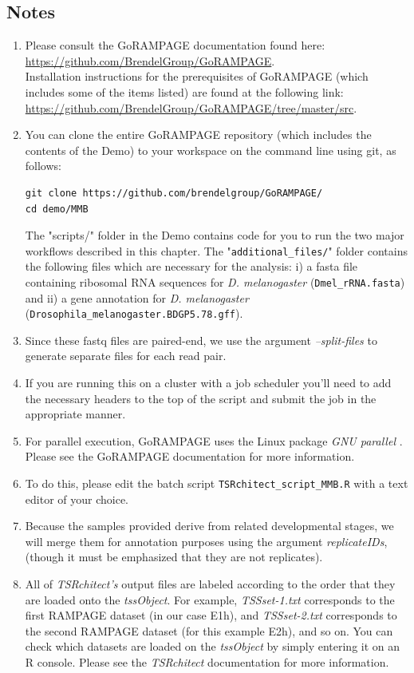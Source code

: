 \documentclass[runningheads,a4paper]{llncs}
\begin{document}
\begin{linenumbers}
\section{Notes}
\begin{enumerate}
\item Please consult the GoRAMPAGE documentation found here:\\
 \url{https://github.com/BrendelGroup/GoRAMPAGE}.\\
Installation instructions for the prerequisites of GoRAMPAGE (which includes some of the items listed) are found at the following link:\\
 \url{https://github.com/BrendelGroup/GoRAMPAGE/tree/master/src}.
\item You can clone the entire GoRAMPAGE repository (which includes the contents of the Demo) to your workspace on the command line using git, as follows:
\begin{verbatim}
git clone https://github.com/brendelgroup/GoRAMPAGE/
cd demo/MMB
\end{verbatim}
The "scripts/" folder in the Demo contains code for you to run the two major workflows described in this chapter.
The "\texttt{additional\_files/}" folder contains the following files which are necessary for the analysis: i) a fasta file containing ribosomal RNA sequences for \textit{D. melanogaster} (\texttt{Dmel\_rRNA.fasta}) and ii) a gene annotation for \textit{D. melanogaster} (\texttt{Drosophila\_melanogaster.BDGP5.78.gff}).
\item Since these fastq files are paired-end, we use the argument \textit{--split-files} to generate separate files for each read pair.
\item If you are running this on a cluster with a job scheduler you'll need to add the necessary headers to the top of the script and submit the job in the appropriate manner.
\item For parallel execution, GoRAMPAGE uses the Linux package \textit{GNU parallel} \cite{Tange2011a}. 
Please see the GoRAMPAGE documentation for more information.
\item To do this, please edit the batch script \texttt{TSRchitect\_script\_MMB.R} with a text editor of your choice.
\item Because the samples provided derive from related developmental stages, we will merge them for annotation purposes using the argument \textit{replicateIDs}, (though it must be emphasized that they are not replicates).
\item All of \textit{TSRchitect's} output files are labeled according to the order that they are loaded onto the \textit{tssObject}. 
For example, \textit{TSSset-1.txt} corresponds to the first RAMPAGE dataset (in our case E1h), and \textit{TSSset-2.txt} corresponds to the second RAMPAGE dataset (for this example E2h), and so on.
You can check which datasets are loaded on the \textit{tssObject} by simply entering it on an R console. 
Please see the \textit{TSRchitect} documentation for more information.


\end{enumerate}
\end{linenumbers}
\end{document}
